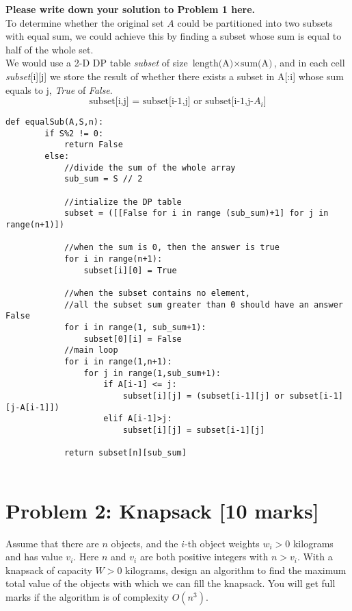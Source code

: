 \documentclass[11pt,twoside]{article}
\newcommand{\problem}[1]{\section*{Problem #1}}
\newenvironment{solution}{{\par\noindent\it Solution.}}{}
\begin{document}
\begin{solution}
\textbf{Please write down your solution to Problem 1 here.}\\
To determine whether the original set $A$ could be partitioned into two subsets with equal sum, we could achieve this by finding a subset whose sum is equal to half of the whole set.\\
We would use a 2-D DP table \textit{subset} of size $\text{length(A)}\times \text{sum(A)}$, and in each cell \textit{subset}[i][j] we store the result of whether there exists a subset in A[:i] whose sum equals to j, \textit{True} of \textit{False}. 
$$\text{subset[i,j] = subset[i-1,j] or subset[i-1,j-$A_{i}$]}$$
\begin{lstlisting}[mathescape]
    def equalSub(A,S,n):
        if S%2 != 0:
            return False
        else:
            //divide the sum of the whole array
            sub_sum = S // 2
            
            //intialize the DP table
            subset = ([[False for i in range (sub_sum)+1] for j in range(n+1)])
            
            //when the sum is 0, then the answer is true
            for i in range(n+1):
                subset[i][0] = True
            
            //when the subset contains no element, 
            //all the subset sum greater than 0 should have an answer False
            for i in range(1, sub_sum+1):
                subset[0][i] = False
            //main loop 
            for i in range(1,n+1):
                for j in range(1,sub_sum+1):
                    if A[i-1] <= j:
                        subset[i][j] = (subset[i-1][j] or subset[i-1][j-A[i-1]])
                    elif A[i-1]>j:
                        subset[i][j] = subset[i-1][j]
            
            return subset[n][sub_sum]
            
\end{lstlisting}
\end{solution}

\problem{2: Knapsack [10 marks]}
Assume that there are $n$ objects, and the $i$-th object weights $w_i>0$ kilograms and has value $v_i$. Here $n$ and $v_i$ are both positive integers with $n>v_i$. With a knapsack of capacity $W>0$ kilograms, design an algorithm to find the maximum total value of the objects with which we can fill the knapsack. You will get full marks if the algorithm is of complexity $O(n^3)$.
\end{document}
